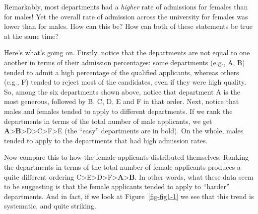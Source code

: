 \documentclass[
  a4paper,
]{book}
\begin{document}
\begin{table}

\caption{\label{tbl-tab1-5}Berkeley students by gender for six largest
departments}

\centering
{}

\end{table}%

Remarkably, most departments had a \emph{higher} rate of admissions for
females than for males! Yet the overall rate of admission across the
university for females was lower than for males. How can this be? How
can both of these statements be true at the same time?

Here's what's going on. Firstly, notice that the departments are not
equal to one another in terms of their admission percentages: some
departments (e.g., A, B) tended to admit a high percentage of the
qualified applicants, whereas others (e.g., F) tended to reject most of
the candidates, even if they were high quality. So, among the six
departments shown above, notice that department A is the most generous,
followed by B, C, D, E and F in that order. Next, notice that males and
females tended to apply to different departments. If we rank the
departments in terms of the total number of male applicants, we get
\textbf{A}\textgreater{}\textbf{B}\textgreater D\textgreater C\textgreater F\textgreater E
(the ``easy'' departments are in bold). On the whole, males tended to
apply to the departments that had high admission rates.

Now compare this to how the female applicants distributed themselves.
Ranking the departments in terms of the total number of female
applicants produces a quite different ordering
C\textgreater E\textgreater D\textgreater F\textgreater{}\textbf{A}\textgreater{}\textbf{B}.
In other words, what these data seem to be suggesting is that the female
applicants tended to apply to ``harder'' departments. And in fact, if we
look at Figure~\ref{fig-fig1-1} we see that this trend is systematic,
and quite striking.
\end{document}
